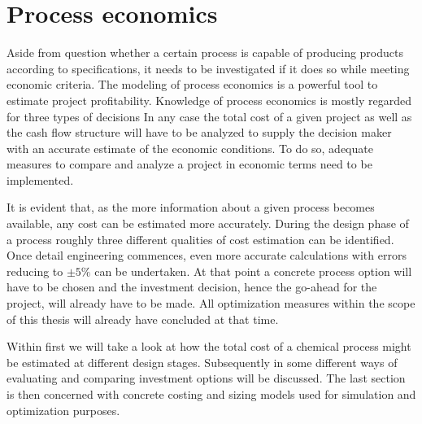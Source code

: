 \chapter{Process economics}
\label{chp:ProcesEconomics}
    Aside from question whether a certain process is capable of producing products according to
    specifications, it needs to be investigated if it does so while meeting economic criteria. The modeling
    of process economics is a powerful tool to estimate project profitability. Knowledge of process economics
    is mostly regarded for three types of decisions
    In any case the total cost of a given project as well as the cash flow structure will have to be analyzed to supply
    the decision maker with an accurate estimate of the economic conditions. To do so, adequate measures to compare and
    analyze a project in economic terms need to be implemented.

    It is evident that, as the more information about a given process becomes available, any cost can be estimated
    more accurately. During the design phase of a process roughly three different qualities of cost estimation can be identified.
    Once detail engineering commences, even more accurate calculations with errors reducing to $\pm 5\%$
    can be undertaken\cite{Peters.2003}. At that point a concrete process option will have to be chosen and
    the investment decision, hence the go-ahead for the project,  will already have to be made. All optimization
    measures within the scope of this thesis will already have concluded at that time.

    Within  first we will take a look at how the total cost of a chemical process might be
    estimated at different design stages. Subsequently in  some different ways
    of evaluating and comparing investment options will be discussed. The last section is then concerned with 
    concrete costing and sizing models used for simulation and optimization purposes. 

